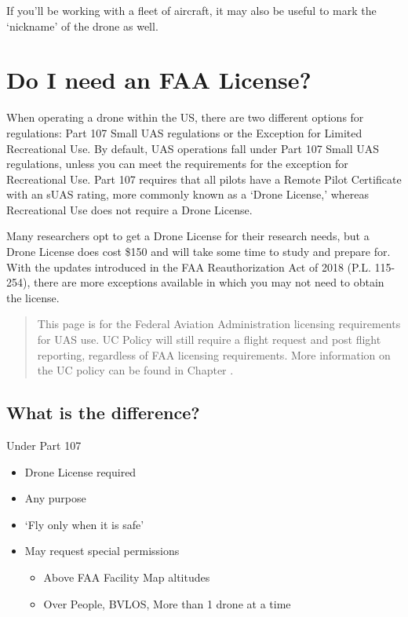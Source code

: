 \documentclass[
]{book}
\providecommand{\tightlist}{%
  \setlength{\itemsep}{0pt}\setlength{\parskip}{0pt}}
\begin{document}
If you'll be working with a fleet of aircraft, it may also be useful to mark the `nickname' of the drone as well.

\hypertarget{ch-license}{%
\chapter{Do I need an FAA License?}\label{ch-license}}

When operating a drone within the US, there are two different options for regulations: Part 107 Small UAS regulations or the Exception for Limited Recreational Use. By default, UAS operations fall under Part 107 Small UAS regulations, unless you can meet the requirements for the exception for Recreational Use. Part 107 requires that all pilots have a Remote Pilot Certificate with an sUAS rating, more commonly known as a `Drone License,' whereas Recreational Use does not require a Drone License.

Many researchers opt to get a Drone License for their research needs, but a Drone License does cost \$150 and will take some time to study and prepare for. With the updates introduced in the FAA Reauthorization Act of 2018 (P.L. 115-254), there are more exceptions available in which you may not need to obtain the license.

\begin{quote}
This page is for the Federal Aviation Administration licensing requirements for UAS use. UC Policy will still require a flight request and post flight reporting, regardless of FAA licensing requirements. More information on the UC policy can be found in Chapter .
\end{quote}

\hypertarget{what-is-the-difference}{%
\section{What is the difference?}\label{what-is-the-difference}}

Under Part 107

\begin{itemize}
\tightlist
\item
  Drone License required
\item
  Any purpose
\item
  `Fly only when it is safe'
\item
  May request special permissions

  \begin{itemize}
  \tightlist
  \item
    Above FAA Facility Map altitudes
  \item
    Over People, BVLOS, More than 1 drone at a time
  \end{itemize}
\end{itemize}
\end{document}
